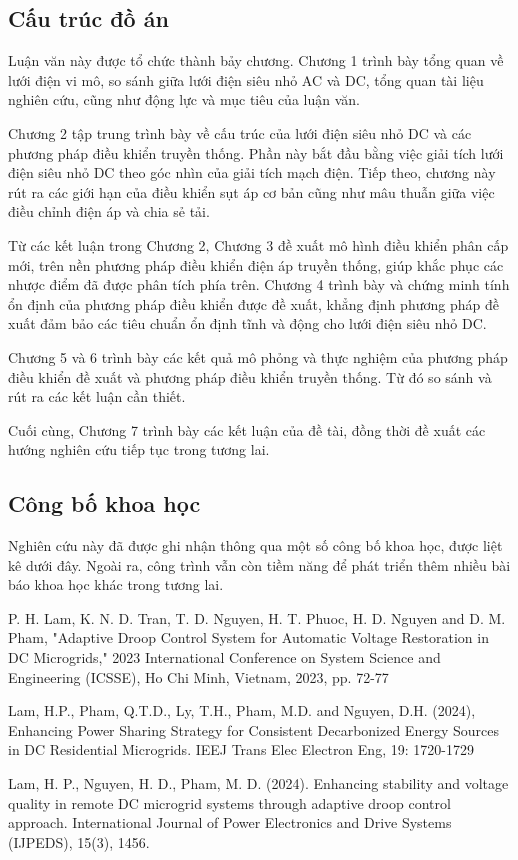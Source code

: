 \subsection{Cấu trúc đồ án}
Luận văn này được tổ chức thành bảy chương. Chương 1 trình bày tổng quan về lưới điện vi mô, so sánh giữa lưới điện siêu nhỏ AC và DC, tổng quan tài liệu nghiên cứu, cũng như động lực và mục tiêu của luận văn. \par
Chương 2 tập trung trình bày về cấu trúc của lưới điện siêu nhỏ DC và các phương pháp điều khiển truyền thống. Phần này bắt đầu bằng việc giải tích lưới điện siêu nhỏ DC theo góc nhìn của giải tích mạch điện. Tiếp theo, chương này rút ra các giới hạn của điều khiển sụt áp cơ bản cũng như mâu thuẫn giữa việc điều chỉnh điện áp và chia sẻ tải. \par
Từ các kết luận trong Chương 2, Chương 3 đề xuất mô hình điều khiển phân cấp mới, trên nền phương pháp điều khiển điện áp truyền thống, giúp khắc phục các nhược điểm đã được phân tích phía trên.
Chương 4 trình bày và chứng minh tính ổn định của phương pháp điều khiển được đề xuất, khẳng định phương pháp đề xuất đảm bảo các tiêu chuẩn ổn định tĩnh và động cho lưới điện siêu nhỏ DC. \par
Chương 5 và 6 trình bày các kết quả mô phỏng và thực nghiệm của phương pháp điều khiển đề xuất và phương pháp điều khiển truyền thống. Từ đó so sánh và rút ra các kết luận cần thiết. \par
Cuối cùng, Chương 7 trình bày các kết luận của đề tài, đồng thời đề xuất các hướng nghiên cứu tiếp tục trong tương lai. \par
\subsection{Công bố khoa học}
Nghiên cứu này đã được ghi nhận thông qua một số công bố khoa học, được liệt kê dưới đây. Ngoài ra, công trình vẫn còn tiềm năng để phát triển thêm nhiều bài báo khoa học khác trong tương lai. \par
[1] P. H. Lam, K. N. D. Tran, T. D. Nguyen, H. T. Phuoc, H. D. Nguyen and D. M. Pham, "Adaptive Droop Control System for Automatic Voltage Restoration in DC Microgrids," 2023 International Conference on System Science and Engineering (ICSSE), Ho Chi Minh, Vietnam, 2023, pp. 72-77 \par
[2] Lam, H.P., Pham, Q.T.D., Ly, T.H., Pham, M.D. and Nguyen, D.H. (2024), Enhancing Power Sharing Strategy for Consistent Decarbonized Energy Sources in DC Residential Microgrids. IEEJ Trans Elec Electron Eng, 19: 1720-1729 \par
[3] Lam, H. P., Nguyen, H. D., Pham, M. D. (2024). Enhancing stability and voltage quality in remote DC microgrid systems through adaptive droop control approach. International Journal of Power Electronics and Drive Systems (IJPEDS), 15(3), 1456. \par